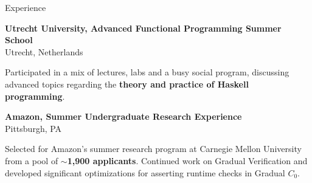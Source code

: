 
\begin{rSection}{Experience}

	{\textbf{\large{Utrecht University, Advanced Functional Programming Summer School}} \hfill \color{darkgray}{07/2023} 
	\\ \vspace*{1mm}
	 \hfill{Utrecht, Netherlands} 
	\\ 
	\color{black}
	\begin{minipage}{40em}
			 Participated in a mix of lectures, labs and a busy social program, discussing advanced topics regarding the \textbf{theory and practice of Haskell programming}.
	\end{minipage}}

	{\textbf{\large{Amazon, Summer Undergraduate Research Experience}} \hfill \color{darkgray}{06/2023 - 08/2023} 
	\\ \vspace*{1mm}
	 \hfill{Pittsburgh, PA} 
	\\ 
	\color{black}
	\begin{minipage}{40em}
		Selected for Amazon's summer research program at Carnegie Mellon University from a pool of \textbf{$\sim$1,900 applicants}. Continued work on Gradual Verification and developed significant optimizations for asserting runtime checks in Gradual $C_0$.
	\end{minipage}}


\end{rSection}
